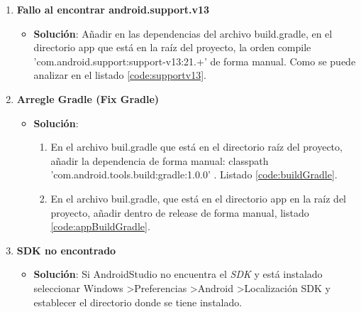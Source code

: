 \begin{enumerate}
\begin{itemize}
				
			\end{itemize}
			
			\item {\bf Fallo al encontrar android.support.v13}
			\begin{itemize}
				\item {\bf Solución}: Añadir en las dependencias del archivo {\ttfamily build.gradle}, en el directorio {\ttfamily app} que está en la raíz del proyecto, la orden {\ttfamily compile 'com.android.support:support-v13:21.+'} de forma manual. Como se puede analizar en el listado \ref{code:supportv13}.
				
				\noindent
				
			\end{itemize}
			
			\item {\bf Arregle Gradle (Fix Gradle)}
			\begin{itemize}
				\item {\bf Solución}:
				\begin{enumerate}
					\item En el archivo {\ttfamily buil.gradle} que está en el directorio raíz del proyecto, añadir la dependencia de forma manual: {\ttfamily classpath 'com.android.tools.build:gradle:1.0.0' }. Listado \ref{code:buildGradle}.
					\item En el archivo {\ttfamily buil.gradle}, que está en el directorio {\ttfamily app} en la raíz del proyecto, añadir dentro de {\ttfamily release} de forma manual, listado \ref{code:appBuildGradle}.
					
				\end{enumerate}
				\noindent
				
				
			\end{itemize}
			
			\item {\bf SDK no encontrado}
			\begin{itemize}
				\item {\bf Solución}: Si AndroidStudio no encuentra el {\it SDK} y está instalado seleccionar {\ttfamily Windows \textgreater Preferencias \textgreater Android \textgreater Localización SDK} y establecer el directorio donde se tiene instalado.
			\end{itemize}
			

\end{enumerate}
